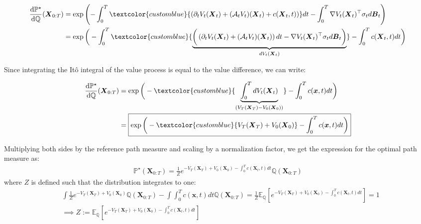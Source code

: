\documentclass{article}
\newcommand{\bluetext}[1]{\textcolor{customblue}{#1}}
\begin{document}
\begin{small}
\begin{align}
    \frac{\mathrm{d}\mathbb{P}^\star}{\mathrm{d}\mathbb{Q}}(\boldsymbol{X}_{0:T})&=\exp\left(-\int_0^T\bluetext{\left(\partial_tV_t(\boldsymbol{X}_t)+(\mathcal{A}_tV_t)(\boldsymbol{X}_t)+c(\boldsymbol{X}_t,t)\right)}dt-\int_0^T\nabla V_t(\boldsymbol{X}_t)^\top \sigma_td\boldsymbol{B}_t\right)\nonumber\\
    &=\exp\bigg(-\int_0^T\bluetext{\underbrace{\bigg(\left(\partial_tV_t(\boldsymbol{X}_t)+(\mathcal{A}_tV_t)(\boldsymbol{X}_t)\right)dt-\nabla V_t(\boldsymbol{X}_t)^\top \sigma_td\boldsymbol{B}_t\bigg)}_{dV_t(\boldsymbol{X}_t)}}-\int_0^Tc(\boldsymbol{X}_t,t)dt\bigg)
\end{align}
\end{small}
Since integrating the Itô integral of the value process is equal to the value difference, we can write:
\begin{small}
\begin{align}
    \frac{\mathrm{d}\mathbb{P}^\star}{\mathrm{d}\mathbb{Q}}(\boldsymbol{X}_{0:T})&=\exp\bigg(-\bluetext{\underbrace{\int_0^TdV_t(\boldsymbol{X}_t)}_{(V_T(\boldsymbol{X}_T)-V_0(\boldsymbol{X}_0))}}-\int_0^Tc(\boldsymbol{x},t)dt\bigg)\nonumber\\
    &=\boxed{\exp\bigg(-\bluetext{V_T(\boldsymbol{X}_T)+V_0(\boldsymbol{X}_0)}-\int_0^Tc(\boldsymbol{x},t)dt\bigg)}
\end{align}
\end{small}
Multiplying both sides by the reference path measure and scaling by a normalization factor, we get the expression for the optimal path measure as:
\begin{align}
    \boxed{\mathbb{P}^\star(\boldsymbol{X}_{0:T})=\frac{1}{Z}e^{-V_T(\boldsymbol{X}_T)+V_0(\boldsymbol{X}_0)-\int_0^Tc(\boldsymbol{X}_t,t)dt}\mathbb{Q}(\boldsymbol{X}_{0:T})}
\end{align}
where $Z$ is defined such that the distribution integrates to one:
\begin{align}
    &\int\frac{1}{Z}e^{-V_T(\boldsymbol{X}_T)+V_0(\boldsymbol{X}_0)}\mathbb{Q}(\boldsymbol{X}_{0:T})-\int\int_0^Tc(\boldsymbol{x},t)dt\mathbb{Q}(\boldsymbol{X}_{0:T})=\frac{1}{Z}\mathbb{E}_{\mathbb{Q}}\left[e^{-V_T(\boldsymbol{X}_T)+V_0(\boldsymbol{X}_0)-\int_0^Tc(\boldsymbol{X}_t,t)dt}\right]=1\nonumber\\
    &\implies \boxed{Z:=\mathbb{E}_{\mathbb{Q}}\left[e^{-V_T(\boldsymbol{X}_T)+V_0(\boldsymbol{X}_0)-\int_0^Tc(\boldsymbol{X}_t,t)dt}\right]}
\end{align}
\end{document}
